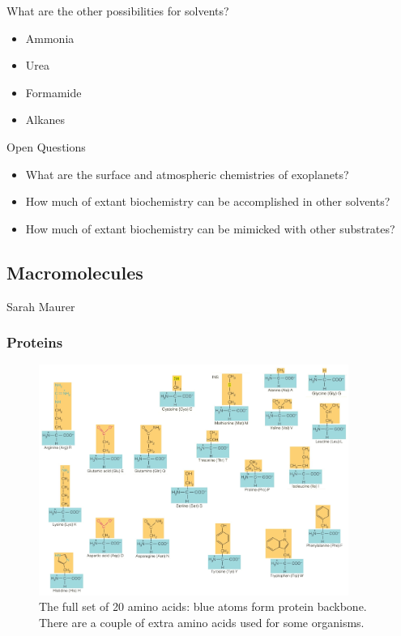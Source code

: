 \documentclass[]{article}
\begin{document}
What are the other possibilities for solvents?
\begin{itemize}
	\item Ammonia
	\item Urea
	\item Formamide
	\item Alkanes
\end{itemize}

Open Questions
\begin{itemize}
	\item What are the surface and atmospheric chemistries of
	exoplanets?
	\item How much of extant biochemistry can be accomplished
	in other solvents?
	\item How much of extant biochemistry can be mimicked with
	other substrates?
\end{itemize}
\subsection{Macromolecules}

Sarah Maurer

\subsubsection{Proteins}

\cite[25.9 Proteins]{brown2009chemistry}

\begin{figure}[H]
	\caption{The full set of 20 amino acids: blue atoms form protein backbone. There are a couple of extra amino acids used for some organisms.}\label{fig:AminoAcids} 
	\includegraphics[width=0.9\textwidth]{AminoAcids}
\end{figure}
\end{document}
